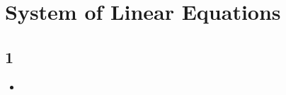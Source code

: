 \chapter{System of Linear Equations}\label{System of Linear Equations}
\section{1}\label{1}
\begin{itemize}
    \item 
\end{itemize}
